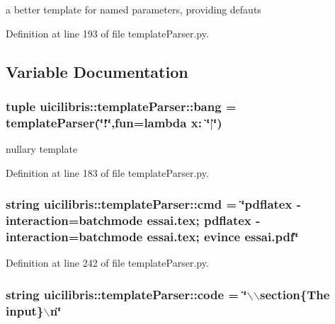 a better template for named parameters, providing defauts 



\-Definition at line 193 of file template\-Parser.\-py.



\subsection{\-Variable \-Documentation}
\hypertarget{namespaceuicilibris_1_1templateParser_ae1c46ccd8cb106ed098a453a34c6485c}{
\subsubsection[{bang}]{\setlength{\rightskip}{0pt plus 5cm}tuple {\bf uicilibris\-::template\-Parser\-::bang} = {\bf template\-Parser}(\char`\"{}!\char`\"{},fun=lambda x\-: \char`\"{}$|$\char`\"{})}}\label{namespaceuicilibris_1_1templateParser_ae1c46ccd8cb106ed098a453a34c6485c}


nullary template 



\-Definition at line 183 of file template\-Parser.\-py.

\hypertarget{namespaceuicilibris_1_1templateParser_a1f824f5c36840363cddaaed894ad175e}{
\subsubsection[{cmd}]{\setlength{\rightskip}{0pt plus 5cm}string {\bf uicilibris\-::template\-Parser\-::cmd} = \char`\"{}pdflatex -\/interaction=batchmode essai.\-tex; pdflatex -\/interaction=batchmode essai.\-tex; evince essai.\-pdf\char`\"{}}}\label{namespaceuicilibris_1_1templateParser_a1f824f5c36840363cddaaed894ad175e}


\-Definition at line 242 of file template\-Parser.\-py.

\hypertarget{namespaceuicilibris_1_1templateParser_a13a85fc84f508035ebb8153b47c5f486}{
\subsubsection[{code}]{\setlength{\rightskip}{0pt plus 5cm}string {\bf uicilibris\-::template\-Parser\-::code} = \char`\"{}$\backslash$$\backslash$section\{\-The {\bf input}\}$\backslash$n\char`\"{}}}\label{namespaceuicilibris_1_1templateParser_a13a85fc84f508035ebb8153b47c5f486}


